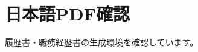 \documentclass[a4paper]{ltjsarticle}
\begin{document}
\section*{日本語PDF確認}
履歴書・職務経歴書の生成環境を確認しています。
\end{document}
